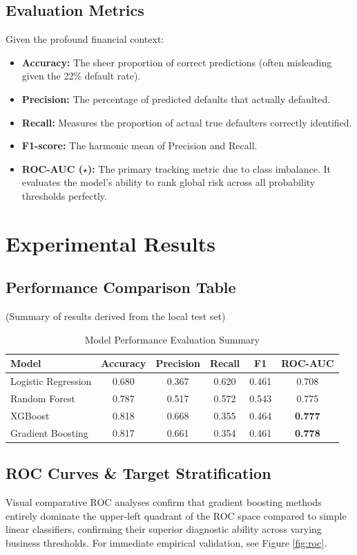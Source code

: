 \documentclass[12pt,a4paper]{article}
\begin{document}
\subsection{Evaluation Metrics}
Given the profound financial context:
\begin{itemize}
    \item \textbf{Accuracy:} The sheer proportion of correct predictions (often misleading given the 22\% default rate).
    \item \textbf{Precision:} The percentage of predicted defaults that actually defaulted.
    \item \textbf{Recall:} Measures the proportion of actual true defaulters correctly identified.
    \item \textbf{F1-score:} The harmonic mean of Precision and Recall.
    \item \textbf{ROC-AUC (\(\star\)):} The primary tracking metric due to class imbalance. It evaluates the model's ability to rank global risk across all probability thresholds perfectly.
\end{itemize}

\section{Experimental Results}
\subsection{Performance Comparison Table}
(Summary of results derived from the local test set)
\begin{table}[h]
\centering
\begin{tabular}{lccccc}
\toprule
\textbf{Model} & \textbf{Accuracy} & \textbf{Precision} & \textbf{Recall} & \textbf{F1} & \textbf{ROC-AUC} \\
\midrule
Logistic Regression & 0.680 & 0.367 & 0.620 & 0.461 & 0.708 \\
Random Forest & 0.787 & 0.517 & 0.572 & 0.543 & 0.775 \\
XGBoost & 0.818 & 0.668 & 0.355 & 0.464 & \textbf{0.777} \\
Gradient Boosting & 0.817 & 0.661 & 0.354 & 0.461 & \textbf{0.778} \\
\bottomrule
\end{tabular}
\caption{Model Performance Evaluation Summary}
\end{table}

\subsection{ROC Curves \& Target Stratification}
Visual comparative ROC analyses confirm that gradient boosting methods entirely dominate the upper-left quadrant of the ROC space compared to simple linear classifiers, confirming their superior diagnostic ability across varying business thresholds. For immediate empirical validation, see Figure \ref{fig:roc}.
\end{document}
